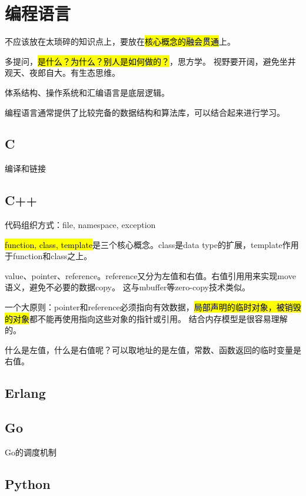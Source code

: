 \chapter{编程语言}

不应该放在太琐碎的知识点上，要放在\hl{核心概念的融会贯通}上。

多提问，\hl{是什么？为什么？别人是如何做的？}，思方学。
视野要开阔，避免坐井观天、夜郎自大。有生态思维。

体系结构、操作系统和汇编语言是底层逻辑。

编程语言通常提供了比较完备的数据结构和算法库，可以结合起来进行学习。

\section{C}

编译和链接

\section{C++}

代码组织方式：file, namespace, exception

\hl{function, class, template}是三个核心概念。class是data type的扩展，template作用于function和class之上。

value、pointer、reference。reference又分为左值和右值。右值引用用来实现move语义，避免不必要的数据copy。
这与mbuffer等zero-copy技术类似。

一个大原则：pointer和reference必须指向有效数据，\hl{局部声明的临时对象，被销毁的对象}都不能再使用指向这些对象的指针或引用。
结合内存模型是很容易理解的。

什么是左值，什么是右值呢？可以取地址的是左值，常数、函数返回的临时变量是右值。

\section{Erlang}

\section{Go}

Go的调度机制

\section{Python}
